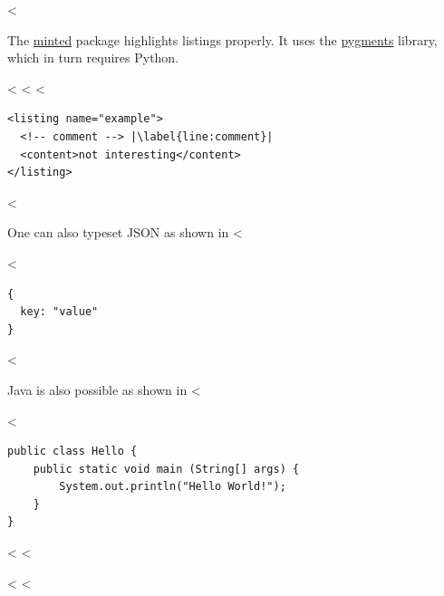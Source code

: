 <%

The \href{https://github.com/gpoore/minted}{minted} package highlights listings properly.
It uses the \href{http://pygments.org/}{pygments} library, which in turn requires Python.

<%
<%
<%

\begin{listing}[htbp]
  \begin{verbatim}
<listing name="example">
  <!-- comment --> |\label{line:comment}|
  <content>not interesting</content>
</listing>
\end{verbatim}
  \caption{Example XML listing using minted}
  \label{lst:XML}
\end{listing}
<%

One can also typeset JSON as shown in <%

<%
\begin{listing}[htbp]
  \begin{verbatim}
{
  key: "value"
}
\end{verbatim}
  \caption{Example JSON listing using minted}
  \label{lst:flJSON}
\end{listing}
<%

Java is also possible as shown in <%

<%
\begin{listing}[htbp]
  \begin{verbatim}
public class Hello {
    public static void main (String[] args) {
        System.out.println("Hello World!");
    }
}
\end{verbatim}
  \caption{Java code rendered using minted}
  \label{lst:flJava}
\end{listing}
<%
<%

<%
<%
